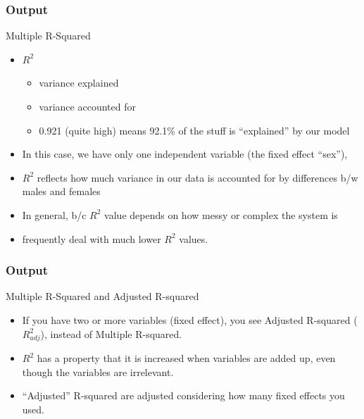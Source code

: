 \documentclass[10p]{beamer}\usepackage[]{graphicx}\usepackage[]{color}
\begin{document}
\begin{frame}
\frametitle{Output}
Multiple R-Squared
\begin{itemize}
\item $R^2$ 
	\begin{itemize}
	\item variance explained
	\item variance accounted for
	\item 0.921 (quite high) means 92.1\% of the stuff is ``explained'' by our model
	\end{itemize}
\item In this case, we have only one independent variable (the fixed effect ``sex''),
\item $R^2$ reflects how much variance in our data is accounted for by \alert{differences b/w males and females}
\item In general, b/c $R^2$ value depends on how messy or complex the system is
\item frequently deal with much lower $R^2$ values. 
\end{itemize}
\end{frame}


\begin{frame}
\frametitle{Output}
Multiple R-Squared and Adjusted R-squared
\begin{itemize}
\item If you have two or more variables (fixed effect), you see Adjusted R-squared ($R^2_{adj}$), instead of Multiple R-squared.
\item $R^2$ has a property that it is increased when variables are added up, even though the variables are irrelevant.
\item ``Adjusted'' R-squared are adjusted considering how many fixed effects you used.
\end{itemize}
\end{frame}
\end{document}
